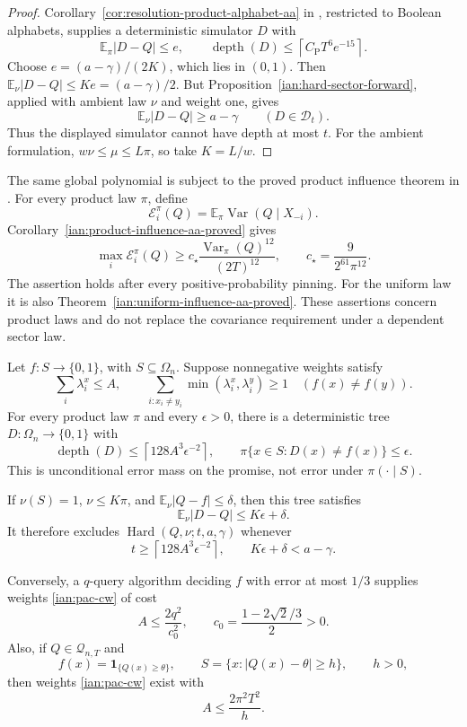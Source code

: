\begin{proof}
Corollary~\ref{cor:resolution-product-alphabet-aa} in
, restricted to Boolean
alphabets, supplies a deterministic simulator \(D\) with
\[
 \mathbb E_\pi|D-Q|\le e,\qquad
 \operatorname{depth}(D)
   \le\left\lceil C_{\mathrm P}T^6e^{-15}\right\rceil.
\]
Choose \(e=(a-\gamma)/(2K)\), which lies in \((0,1)\).
Then \(\mathbb E_\nu|D-Q|\le Ke=(a-\gamma)/2\).
But Proposition~\ref{ian:hard-sector-forward}, applied with ambient
law \(\nu\) and weight one, gives
\[
 \mathbb E_\nu|D-Q|\ge a-\gamma
 \qquad(D\in\mathcal D_t).
\]
Thus the displayed simulator cannot have depth at most \(t\).
For the ambient formulation, \(w\nu\le\mu\le L\pi\), so take
\(K=L/w\).
\end{proof}

\begin{remark}
\label{ian:pac-product-influence}
The same global polynomial is subject to the proved product
influence theorem in
.
For every product law \(\pi\), define
\[
 \mathcal E_i^\pi(Q)
   =\mathbb E_\pi\operatorname{Var}(Q\mid X_{-i}).
\]
Corollary~\ref{ian:product-influence-aa-proved} gives
\[
 \max_i\mathcal E_i^\pi(Q)
 \ge c_\star
       \frac{\operatorname{Var}_\pi(Q)^{12}}{(2T)^{12}},
 \qquad c_\star=\frac9{2^{61}\pi^{12}}.
\]
The assertion holds after every positive-probability pinning.
For the uniform law it is also
Theorem~\ref{ian:uniform-influence-aa-proved}.
These assertions concern product laws and do not replace the
covariance requirement under a dependent sector law.
\end{remark}

\begin{proposition}
\label{ian:pac-completion-weights}
Let \(f:S\to\{0,1\}\), with \(S\subseteq\Omega_n\).
Suppose nonnegative weights satisfy
\[
 \sum_i\lambda_i^x\le A,\qquad
 \sum_{i:x_i\ne y_i}\min(\lambda_i^x,\lambda_i^y)\ge1
       \quad(f(x)\ne f(y)).
 \tag{32.6}\label{ian:pac-cw}
\]
For every product law \(\pi\) and every \(\epsilon>0\), there is a
deterministic tree \(D:\Omega_n\to\{0,1\}\) with
\[
 \operatorname{depth}(D)
 \le\left\lceil128A^3\epsilon^{-2}\right\rceil,
 \qquad
 \pi\{x\in S:D(x)\ne f(x)\}\le\epsilon.
\]
This is unconditional error mass on the promise, not error under
\(\pi(\cdot\mid S)\).

If \(\nu(S)=1\), \(\nu\le K\pi\), and
\(\mathbb E_\nu|Q-f|\le\delta\), then this tree satisfies
\[
 \mathbb E_\nu|D-Q|\le K\epsilon+\delta.
\]
It therefore excludes
\(\operatorname{Hard}(Q,\nu;t,a,\gamma)\) whenever
\[
 t\ge\left\lceil128A^3\epsilon^{-2}\right\rceil,
 \qquad K\epsilon+\delta<a-\gamma.
 \tag{32.7}\label{ian:pac-completion-exclusion}
\]

Conversely, a \(q\)-query algorithm deciding \(f\) with error at
most \(1/3\) supplies weights \eqref{ian:pac-cw} of cost
\[
 A\le\frac{2q^2}{c_0^2},
 \qquad c_0=\frac{1-2\sqrt2/3}{2}>0.
\]
Also, if \(Q\in\mathcal Q_{n,T}\) and
\[
 f(x)=\mathbf1_{\{Q(x)\ge\theta\}},\qquad
 S=\{x:|Q(x)-\theta|\ge h\},\qquad h>0,
\]
then weights \eqref{ian:pac-cw} exist with
\[
 A\le\frac{2\pi^2T^2}{h}.
\]
\end{proposition}

